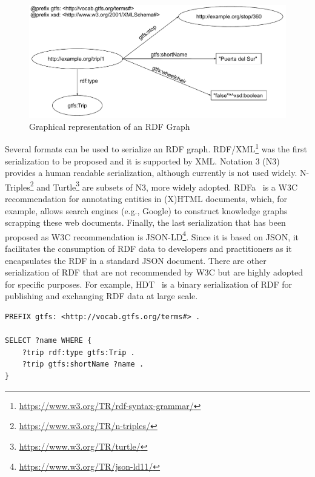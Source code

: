 \begin{figure}[!ht]
\centering
\includegraphics[width=\textwidth]{figures/state-of-the-art/RDF.pdf}
\caption{Graphical representation of an RDF Graph}
\label{fig:soa_rdf_example}
\end{figure}


Several formats can be used to serialize an RDF graph. RDF/XML\footnote{\url{https://www.w3.org/TR/rdf-syntax-grammar/}} was the first serialization to be proposed and it is supported by XML. Notation 3 (N3) provides a human readable serialization, although currently is not used widely. N-Triples\footnote{\url{https://www.w3.org/TR/n-triples/}} and Turtle\footnote{\url{https://www.w3.org/TR/turtle/}} are subsets of N3, more widely adopted. RDFa~\citep{adida2008rdfa} is a W3C recommendation for annotating entities in (X)HTML documents, which, for example, allows search engines (e.g., Google) to construct knowledge graphs scrapping these web documents. Finally, the last serialization that has been proposed as W3C recommendation is JSON-LD\footnote{\url{https://www.w3.org/TR/json-ld11/}}. Since it is based on JSON, it facilitates the consumption of RDF data to developers and practitioners as it encapsulates the RDF in a standard JSON document. There are other serialization of RDF that are not recommended by W3C but are highly adopted for specific purposes. For example, HDT~\citep{fernandez2013binary} is a binary serialization of RDF for publishing and exchanging RDF data at large scale.

\begin{lstlisting}[float,caption=Example of SPARQL query,frame=tlrb,label={list:soa_sparql_example}, columns=fullflexible]
PREFIX gtfs: <http://vocab.gtfs.org/terms#> .

SELECT ?name WHERE {
    ?trip rdf:type gtfs:Trip .
    ?trip gtfs:shortName ?name .
}
\end{lstlisting}
